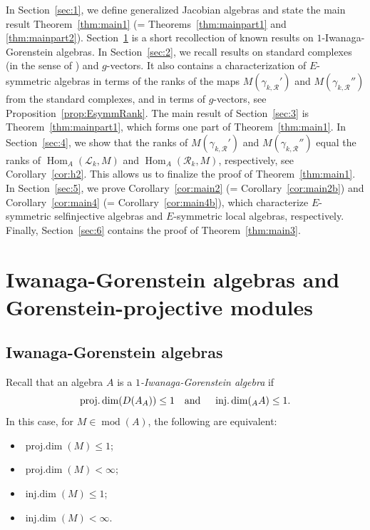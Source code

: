 \documentclass[12pt,reqno]{amsart}
\theoremstyle{definition}
\newcommand{\scL}{{\mathscr L}}
\newcommand{\scR}{{\mathscr R}}
\newcommand{\cR}{{\mathcal R}}
\newcommand{\md}{\operatorname{mod}}
\newcommand{\pdim}{\operatorname{proj.dim}}
\newcommand{\idim}{\operatorname{inj.dim}}
\newcommand{\Hom}{\operatorname{Hom}}
\begin{document}
In
Section~\ref{sec:1}, we define generalized Jacobian algebras
and state the main result 
Theorem~\ref{thm:main1} (= Theorems~\ref{thm:mainpart1} and \ref{thm:mainpart2}).
Section~\ref{sec:IG} is a short recollection of known results on
$1$-Iwanaga-Gorenstein algebras.
In
Section~\ref{sec:2}, we
recall results on standard complexes (in the sense of
\cite{GHLS26}) and $g$-vectors.
It also contains a characterization of $E$-symmetric algebras in terms of the ranks of the maps  $M(\gamma_{k,\cR}')$ and
$M(\gamma_{k,\cR}'')$ from the standard complexes, and in terms of $g$-vectors, see Proposition~\ref{prop:EsymmRank}.
The main result of
Section~\ref{sec:3} is 
Theorem~\ref{thm:mainpart1}, which forms one part of 
Theorem~\ref{thm:main1}.
In
Section~\ref{sec:4}, we 
show that the ranks of $M(\gamma_{k,\cR}')$ and
$M(\gamma_{k,\cR}'')$ 
equal the ranks of $\Hom_A(\scL_k,M)$ and $\Hom_A(\scR_k,M)$, respectively, see Corollary~\ref{cor:h2}.
This allows us to finalize the proof of
Theorem~\ref{thm:main1}.
In
Section~\ref{sec:5}, we prove
Corollary~\ref{cor:main2} (= Corollary~\ref{cor:main2b})
and Corollary~\ref{cor:main4} (= Corollary~\ref{cor:main4b}),
which characterize $E$-symmetric selfinjective algebras
and $E$-symmetric local algebras, respectively.
Finally,
Section~\ref{sec:6} contains the proof of Theorem~\ref{thm:main3}.


\section{Iwanaga-Gorenstein algebras and Gorenstein-projective modules}
\label{sec:IG}


\subsection{Iwanaga-Gorenstein algebras}
Recall that
an algebra $A$ is a \emph{$1$-Iwanaga-Gorenstein algebra} if
$$
\pdim(D(A_A)) \le 1 
\text{\quad and \quad}
\idim({_A}A) \le 1.
$$
In this case, for $M \in \md(A)$, the following are equivalent:
\begin{itemize}\itemsep2mm

\item[(i)]
$\pdim(M) \le 1$;

\item[(ii)]
$\pdim(M) < \infty$;

\item[(iii)]
$\idim(M) \le 1$;

\item[(iv)]
$\idim(M) < \infty$.

\end{itemize}
\end{document}
